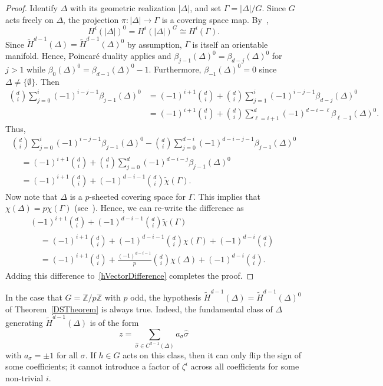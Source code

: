 \documentclass[ALCO,ThmDefs,Unicode]{cedram}
\newcommand{\ZZ}{{\mathbb Z}}
\begin{document}
\begin{proof}
Identify $\Delta$ with its geometric realization $|\Delta|$, and set $\Gamma= |\Delta|/G$. Since $G$ acts freely on $\Delta$, the projection $\pi:|\Delta|\to \Gamma$ is a covering space map. By~\cite[Proposition~3G.1]{Hatcher},
\[
H^i(|\Delta|)^0=H^i(|\Delta|)^G\cong H^i(\Gamma).
\]
Since $\widetilde{H}^{d-1}(\Delta)=\widetilde{H}^{d-1}(\Delta)^0$ by assumption, $\Gamma$ is itself an orientable manifold. Hence, Poincar\'e duality applies and $\beta_{j-1}(\Delta)^0=\beta_{d-j}(\Delta)^0$ for $j>1$ while $\beta_0(\Delta)^0=\beta_{d-1}(\Delta)^0-1$. Furthermore, $\beta_{-1}(\Delta)^0=0$ since $\Delta\not=\{\emptyset\}$. Then
\begin{align*}
\binom{d}{i}\sum_{j=0}^i(-1)^{i-j-1}\beta_{j-1}(\Delta)^0&=(-1)^{i+1}\binom{d}{i}+\binom{d}{i}\sum_{j=1}^i(-1)^{i-j-1}\beta_{d-j}(\Delta)^0\\
&=(-1)^{i+1}\binom{d}{i}+\binom{d}{i}\sum_{\ell=i+1}^{d}(-1)^{d-i-\ell}\beta_{\ell -1}(\Delta)^0.
\end{align*}
Thus,
\begin{multline*}
\binom{d}{i}\sum_{j=0}^i(-1)^{i-j-1}\beta_{j-1}(\Delta)^0-\binom{d}{i}\sum_{j=0}^{d-i}(-1)^{d-i-j-1}\beta_{j-1}(\Delta)^0\\
\begin{aligned}
&=(-1)^{i+1}\binom{d}{i}+\binom{d}{i}\sum_{j=0}^d(-1)^{d-i-j}\beta_{j-1}(\Delta)^0\\
&=(-1)^{i+1}\binom{d}{i}+(-1)^{d-i-1}\binom{d}{i}\tilde{\chi}(\Gamma).
\end{aligned}
\end{multline*}
Now note that $\Delta$ is a $p$-sheeted covering space for $\Gamma$. This implies that $\chi(\Delta)=p\chi(\Gamma)$ (see~\cite[Section~2.2]{Hatcher}). Hence, we can re-write the difference as
\begin{multline*}
(-1)^{i+1}\binom{d}{i}+(-1)^{d-i-1}\binom{d}{i}\tilde{\chi}(\Gamma)\\
\begin{aligned}
&=(-1)^{i+1}\binom{d}{i}+(-1)^{d-i-1}\binom{d}{i}\chi(\Gamma)+(-1)^{d-i}\binom{d}{i}\\
&=(-1)^{i+1}\binom{d}{i}+\frac{(-1)^{d-i-1}}{p}\binom{d}{i}\chi(\Delta)+(-1)^{d-i}\binom{d}{i}.
\end{aligned}
\end{multline*}
Adding this difference to~\eqref{hVectorDifference} completes the proof.
\end{proof}

\begin{rema}
In the case that $G=\ZZ/p\ZZ$ with $p$ odd, the hypothesis $\widetilde{H}^{d-1}(\Delta)=\widetilde{H}^{d-1}(\Delta)^0$ of Theorem~\ref{DSTheorem} is always true. Indeed, the fundamental class of $\Delta$ generating $\widetilde{H}^{d-1}(\Delta)$ is of the form
\[
z = \sum_{\widehat{\sigma}\in C^{d-1}(\Delta)}a_\sigma \widehat{\sigma}
\]
with $a_\sigma=\pm 1$ for all $\sigma$. If $h\in G$ acts on this class, then it can only flip the sign of some coefficients; it cannot introduce a factor of $\zeta^i$ across all coefficients for some non-trivial $i$.
\end{rema}
\end{document}
